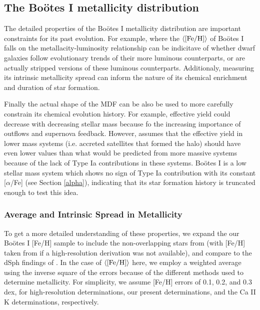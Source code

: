 \documentclass[iop]{emulateapj}
\def\bootes{Bo\"{o}tes I}
\begin{document}
\subsection{The \bootes{} metallicity distribution}

The detailed properties of the \bootes{} metallicity distribution are
important constraints for its past evolution. For example, where the
$\langle {\rm [Fe/H]} \rangle$ of \bootes{} falls on the
metallacity-luminosity relationship can be indicitave of whether dwarf
galaxies follow evolutionary trends of their more luminous
counterparts, or are actually stripped versions of these luminous
counterparts. Additionaly, measuring its intrinsic metallicity spread
can inform the nature of its chemical enrichment and duration of star
formation. 

Finally the actual shape of the MDF can be also be used to
more carefully constrain its chemical evolution history. For example,
effective yield could decrease with decreasing stellar mass because fo
the increasing importance of outflows and supernova
feedback. However, \citet{prantzos08} assumes that the effective yield in lower
mass systems (i.e. accreted satellites that formed the halo) should
have even lower values than what would be predicted from more massive
systems because of the lack of Type Ia contributions in these
systems. \bootes{} is a low stellar mass system which shows no sign of
Type Ia contribution with its constant [$\alpha$/Fe] (see Section \ref{alpha}),
indicating that its star formation history is truncated enough to test
this idea.   

\subsubsection{Average and Intrinsic Spread in Metallicity}

To get a more detailed understanding of these properties, we expand
the our \bootes{} [Fe/H] sample to include the non-overlapping stars
from \citet{norris10b} (with [Fe/H] taken from \citet{feltzing09} if
a high-resolution derivation was not available), and compare to the
dSph findings of \citet{kirby11a}. In the case of $\langle {\rm
  [Fe/H]} \rangle$ here, we employ a weighted average using the inverse
square of the errors because of the different methods used to
determine metallicity. For simplicity, we assume [Fe/H] errors of 0.1,
0.2, and 0.3 dex, for high-resolution determinations, our present
determinations, and the Ca II K determinations, respectively.
\end{document}
